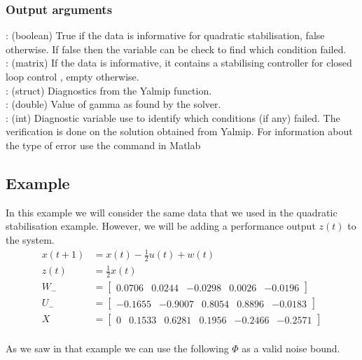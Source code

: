 \subsubsection*{Output arguments}
\textbf{}: (boolean) True if the data is informative for quadratic stabilisation, false otherwise. If false then the  variable can be check to find which condition failed. \\
\textbf{}: (matrix) If the data is informative, it contains a stabilising controller  for closed loop control , empty otherwise.\\
\textbf{}: (struct) Diagnostics from the Yalmip  function. \\
\textbf{}: (double) Value of gamma as found by the solver. \\
\textbf{}: (int) Diagnostic variable use to identify which conditions (if any) failed. The verification is done on the solution obtained from Yalmip. For information about the type of error use the  command in Matlab


\subsection{Example} \label{ExampleH2}
In this example we will consider the same data that we used in the quadratic stabilisation example. However, we will be adding a performance output $z(t)$ to the system.
\begin{align*}
	x(t+1) &= x(t) - \frac{1}{2}u(t) + w(t) \\
	z(t)   &= \frac{1}{2}x(t) \\
	W_- &= \begin{bmatrix}  0.0706 &  0.0244 & -0.0298 & 0.0026 & -0.0196 \end{bmatrix} \\
	U_- &= \begin{bmatrix} -0.1655 & -0.9007 &  0.8054 & 0.8896 & -0.0183 \end{bmatrix} \\
	X   &= \begin{bmatrix}     0   &  0.1533 &  0.6281 & 0.1956 & -0.2466 & -0.2571 \end{bmatrix} \\
\end{align*}

As we saw in that example we can use the following $\Phi$ as a valid noise bound.

